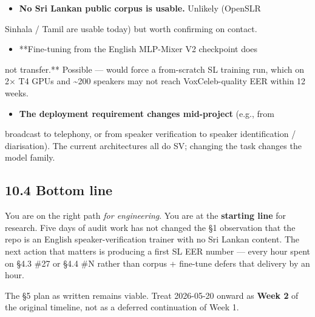 \documentclass[10pt,a4paper]{article}
\begin{document}
\begin{itemize}[leftmargin=*,itemsep=2pt]
  \item \textbf{No Sri Lankan public corpus is usable.} Unlikely (OpenSLR
\end{itemize}
Sinhala / Tamil are usable today) but worth confirming on contact.
\begin{itemize}[leftmargin=*,itemsep=2pt]
  \item **Fine-tuning from the English MLP-Mixer V2 checkpoint does
\end{itemize}
not transfer.** Possible --- would force a from-scratch SL training run, which on 2$\times$ T4 GPUs and \textasciitilde{}200 speakers may not reach VoxCeleb-quality EER within 12 weeks.
\begin{itemize}[leftmargin=*,itemsep=2pt]
  \item \textbf{The deployment requirement changes mid-project} (e.g., from
\end{itemize}
broadcast to telephony, or from speaker verification to speaker identification / diarisation). The current architectures all do SV; changing the task changes the model family.

\subsection*{10.4 Bottom line}

You are on the right path \textit{for engineering}. You are at the \textbf{starting line} for research. Five days of audit work has not changed the §1 observation that the repo is an English speaker-verification trainer with no Sri Lankan content. The next action that matters is producing a first SL EER number --- every hour spent on §4.3 \#27 or §4.4 \#N rather than corpus + fine-tune defers that delivery by an hour.

The §5 plan as written remains viable. Treat 2026-05-20 onward as \textbf{Week 2} of the original timeline, not as a deferred continuation of Week 1.
\end{document}
